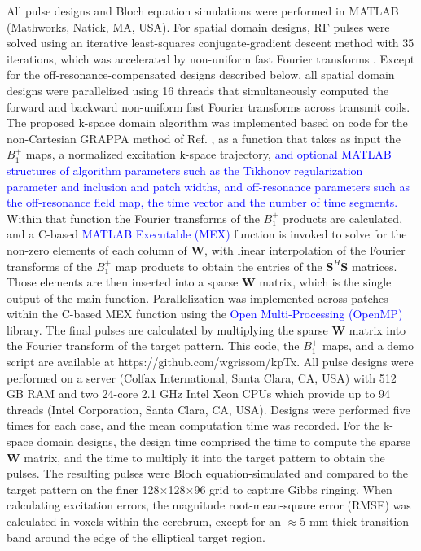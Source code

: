 \par All pulse designs and Bloch equation simulations were performed in MATLAB (Mathworks, Natick, MA, USA).
For spatial domain designs, 
RF pulses were solved using an iterative least-squares conjugate-gradient descent method \cite{Grissom:2006:MRM} with 35 iterations,
which was accelerated by non-uniform fast Fourier transforms \cite{Fessler:2003fk}. 
Except for the off-resonance-compensated designs described below, 
all spatial domain designs were parallelized using 16 threads that simultaneously computed the forward and backward 
non-uniform fast Fourier transforms across transmit coils. 
The proposed k-space domain algorithm was implemented based on code for the non-Cartesian GRAPPA method of Ref. \cite{luo2019grappa},
as a function that takes as input the $B_1^+$ maps, 
a normalized excitation k-space trajectory, \textcolor{blue}{and optional MATLAB structures of algorithm parameters such as the Tikhonov regularization parameter
and inclusion and patch widths, and off-resonance parameters such as the off-resonance field map, the time vector and the number of time segments.} 
Within that function the Fourier transforms of the $B_1^+$ products are calculated,
and a C-based \textcolor{blue}{MATLAB Executable (MEX)} function is invoked to solve for the non-zero elements of each column of $\bm{W}$,
with linear interpolation of the Fourier transforms of the $B_1^+$ map products to obtain the entries of the $\bm{S}^H\bm{S}$ matrices. 
Those elements are then inserted into a sparse $\bm{W}$ matrix, which is the single output of the main function. 
Parallelization was implemented across patches within the C-based MEX function using the \textcolor{blue}{Open Multi-Processing (OpenMP)} library. 
The final pulses are calculated by multiplying the sparse $\bm{W}$ matrix into the Fourier transform of the target pattern. 
This code, the $B_1^+$ maps, and a demo script are available at https://github.com/wgrissom/kpTx. 
All pulse designs were performed on a server (Colfax International, Santa Clara, CA, USA) 
with 512 GB RAM and two 24-core 2.1 GHz Intel Xeon CPUs which provide up to 94 threads (Intel Corporation, Santa Clara, CA, USA). 
Designs were performed five times for each case, and the mean computation time was recorded.
For the k-space domain designs, the design time comprised the time to compute the sparse $\bm{W}$ matrix, 
and the time to multiply it into the target pattern to obtain the pulses.
The resulting pulses were Bloch equation-simulated and compared to the target pattern on the finer 128$\times$128$\times$96 grid to capture Gibbs ringing. 
When calculating excitation errors, the magnitude root-mean-square error (RMSE) was calculated in voxels within the cerebrum,
except for an $\approx$5 mm-thick transition band around the edge of the elliptical target region.


